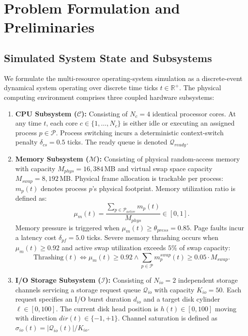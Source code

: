 \documentclass[conference]{IEEEtran}
\begin{document}
\section{Problem Formulation and Preliminaries}
\label{sec:problem_formulation}

\subsection{Simulated System State and Subsystems}
We formulate the multi-resource operating-system simulation as a discrete-event dynamical system operating over discrete time ticks $t \in \mathbb{R}^+$. The physical computing environment comprises three coupled hardware subsystems:
\begin{enumerate}
    \item \textbf{CPU Subsystem ($\mathcal{C}$):} Consisting of $N_c = 4$ identical processor cores. At any time $t$, each core $c \in \{1, \dots, N_c\}$ is either idle or executing an assigned process $p \in \mathcal{P}$. Process switching incurs a deterministic context-switch penalty $\delta_{cs} = 0.5$ ticks. The ready queue is denoted $\mathcal{Q}_{ready}$.
    \item \textbf{Memory Subsystem ($\mathcal{M}$):} Consisting of physical random-access memory with capacity $M_{phys} = 16,384$\,MB and virtual swap space capacity $M_{swap} = 8,192$\,MB. Physical frame allocation is trackable per process: $m_p(t)$ denotes process $p$'s physical footprint. Memory utilization ratio is defined as:
    \begin{equation}
        \mu_m(t) = \frac{\sum_{p \in \mathcal{P}_{active}} m_p(t)}{M_{phys}} \in [0, 1].
    \end{equation}
    Memory pressure is triggered when $\mu_m(t) \ge \theta_{press} = 0.85$. Page faults incur a latency cost $\delta_{pf} = 5.0$ ticks. Severe memory thrashing occurs when $\mu_m(t) \ge 0.92$ and active swap utilization exceeds $5\%$ of swap capacity:
    \begin{equation}
        \label{eq:thrashing_def}
        \text{Thrashing}(t) \iff \mu_m(t) \ge 0.92 \land \sum_{p \in \mathcal{P}} m_p^{swap}(t) \ge 0.05 \cdot M_{swap}.
    \end{equation}
    \item \textbf{I/O Storage Subsystem ($\mathcal{I}$):} Consisting of $N_{io} = 2$ independent storage channels servicing a storage request queue $\mathcal{Q}_{io}$ with capacity $K_{io} = 50$. Each request specifies an I/O burst duration $d_{io}$ and a target disk cylinder $\ell \in [0, 100]$. The current disk head position is $h(t) \in [0, 100]$ moving with direction $dir(t) \in \{-1, +1\}$. Channel saturation is defined as $\sigma_{io}(t) = |\mathcal{Q}_{io}(t)| / K_{io}$.
\end{enumerate}
\end{document}

